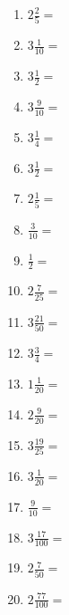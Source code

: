\documentclass[12pt]{article}
\begin{document}
\begin{enumerate}
\item \large $ 2 \frac{2}{5} = $ \vspace{1.3cm}
\item \large $ 3 \frac{1}{10} = $ \vspace{1.3cm}
\item \large $ 3 \frac{1}{2} = $ \vspace{1.3cm}
\item \large $ 3 \frac{9}{10} = $ \vspace{1.3cm}
\item \large $ 3 \frac{1}{4} = $ \vspace{1.3cm}
\item \large $ 3 \frac{1}{2} = $ \vspace{1.3cm}
\item \large $ 2 \frac{1}{5} = $ \vspace{1.3cm}
\item \large $ \frac{3}{10} = $ \vspace{1.3cm}
\item \large $ \frac{1}{2} = $ \vspace{1.3cm}
\item \large $ 2 \frac{7}{25} = $ \vspace{1.3cm}
\newpage
\item \large $ 3 \frac{21}{50} = $ \vspace{1.5cm}
\item \large $ 3 \frac{3}{4} = $ \vspace{1.5cm}
\item \large $ 1 \frac{1}{20} = $ \vspace{1.5cm}
\item \large $ 2 \frac{9}{20} = $ \vspace{1.5cm}
\item \large $ 3 \frac{19}{25} = $ \vspace{1.5cm}
\item \large $ 3 \frac{1}{20} = $ \vspace{1.5cm}
\item \large $ \frac{9}{10} = $ \vspace{1.5cm}
\item \large $ 3 \frac{17}{100} = $ \vspace{1.5cm}
\item \large $ 2 \frac{7}{50} = $ \vspace{1.5cm}
\item \large $ 2 \frac{77}{100} = $ \vspace{1.5cm}

\end{enumerate}
\end{document}
